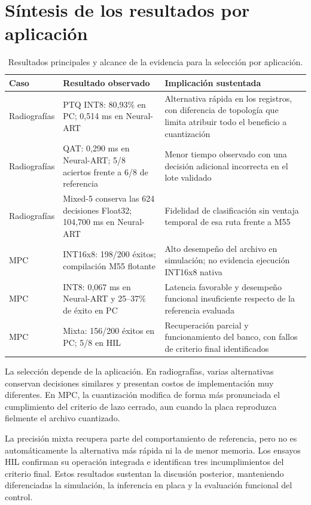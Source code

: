 \section{Síntesis de los resultados por aplicación}\label{sec:sintesis_resultados}
\begin{table}[htbp]\centering\small
\caption{Resultados principales y alcance de la evidencia para la selección por aplicación.}\label{tab:res_sintesis}
\begin{tabularx}{\linewidth}{p{2.5cm}YY}\toprule
Caso & Resultado observado & Implicación sustentada\\\midrule
Radiografías & PTQ INT8: 80,93\% en PC; 0,514 ms en Neural-ART & Alternativa rápida en los registros, con diferencia de topología que limita atribuir todo el beneficio a cuantización\\
Radiografías & QAT: 0,290 ms en Neural-ART; 5/8 aciertos frente a 6/8 de referencia & Menor tiempo observado con una decisión adicional incorrecta en el lote validado\\
Radiografías & Mixed-5 conserva las 624 decisiones Float32; 104,700 ms en Neural-ART & Fidelidad de clasificación sin ventaja temporal de esa ruta frente a M55\\
MPC & INT16x8: 198/200 éxitos; compilación M55 flotante & Alto desempeño del archivo en simulación; no evidencia ejecución INT16x8 nativa\\
MPC & INT8: 0,067 ms en Neural-ART y 25--37\% de éxito en PC & Latencia favorable y desempeño funcional insuficiente respecto de la referencia evaluada\\
MPC & Mixta: 156/200 éxitos en PC; 5/8 en HIL & Recuperación parcial y funcionamiento del banco, con fallos de criterio final identificados\\\bottomrule
\end{tabularx}
\end{table}

La selección depende de la aplicación. En radiografías, varias alternativas conservan decisiones similares y presentan costos de implementación muy diferentes. En MPC, la cuantización modifica de forma más pronunciada el cumplimiento del criterio de lazo cerrado, aun cuando la placa reproduzca fielmente el archivo cuantizado.

La precisión mixta recupera parte del comportamiento de referencia, pero no es automáticamente la alternativa más rápida ni la de menor memoria. Los ensayos HIL confirman su operación integrada e identifican tres incumplimientos del criterio final. Estos resultados sustentan la discusión posterior, manteniendo diferenciadas la simulación, la inferencia en placa y la evaluación funcional del control.

